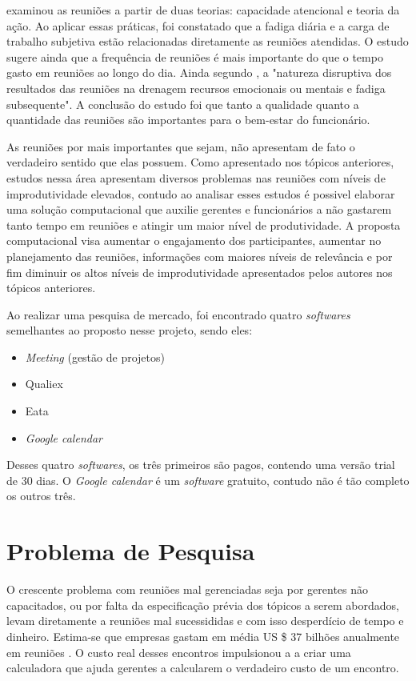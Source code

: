 \cite{rogelberg} examinou as reuniões a partir de duas teorias: capacidade atencional e teoria da ação. Ao aplicar essas práticas, foi constatado que a fadiga diária e a carga de trabalho subjetiva estão relacionadas diretamente as reuniões atendidas. O estudo sugere ainda que a frequência de reuniões é mais importante do que o tempo gasto em reuniões ao longo do dia. Ainda segundo \cite{rogelberg}, a "natureza disruptiva dos resultados das reuniões na drenagem recursos emocionais ou mentais e fadiga subsequente". A conclusão do estudo foi que tanto a qualidade quanto a quantidade das reuniões são importantes para o bem-estar do funcionário. 

As reuniões por mais importantes que sejam, não apresentam de fato o verdadeiro sentido que elas possuem. Como apresentado nos tópicos anteriores, estudos nessa área apresentam diversos problemas nas reuniões  com níveis de improdutividade elevados, contudo ao analisar esses estudos é possivel elaborar uma solução computacional que auxilie gerentes e funcionários a não gastarem tanto tempo em reuniões e atingir um maior nível de produtividade. A proposta computacional visa aumentar o engajamento dos participantes, aumentar no planejamento das reuniões, informações com maiores níveis de relevância e por fim diminuir os altos níveis de improdutividade apresentados pelos autores nos tópicos anteriores.

Ao realizar uma pesquisa de mercado, foi encontrado quatro \textit{softwares} semelhantes ao proposto nesse projeto, sendo eles: 

\begin{itemize}
    \item \textit{Meeting} (gestão de projetos)
    \item Qualiex
    \item Eata
    \item \textit{Google calendar}
\end{itemize}

Desses quatro \textit{softwares}, os três primeiros são pagos, contendo uma versão trial de 30 dias. O \textit{Google calendar} é um \textit{software} gratuito, contudo não é tão completo os outros três.  

\section{Problema de Pesquisa}
\label{sec:problema_de_pesquisa}

O crescente problema com reuniões mal gerenciadas seja por gerentes não capacitados, ou por falta da especificação prévia dos tópicos a serem abordados, levam diretamente a reuniões mal sucessididas e com isso desperdício de tempo e dinheiro. Estima-se que empresas gastam em média US \$ 37 bilhões anualmente em reuniões \cite{baer}. O custo real desses encontros impulsionou a \cite{harvard} a criar uma calculadora que ajuda gerentes a calcularem o verdadeiro custo de um encontro.

